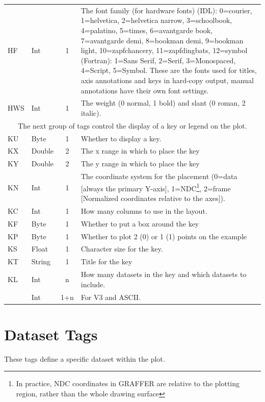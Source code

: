 \documentclass[english]{article}
\begin{document}
\begin{longtable}{|llcp{9cm}|}
  HF& Int& 1& The font family (for hardware fonts) (IDL): 0=courier,
  1=helvetica, 2=helvetica narrow, 3=schoolbook, 4=palatino, 5=times,
  6=avantgarde book, 7=avantgarde demi, 8=bookman demi, 9=bookman
  light, 10=zapfchancery, 11=zapfdingbats, 12=symbol (Fortran): 1=Sans
  Serif, 2=Serif, 3=Monospaced, 4=Script, 5=Symbol. These are the fonts
  used for titles, axis annotations and keys in hard-copy output,
  manual annotations have their own font
  settings.\\
  HWS& Int& 1&
  The weight (0 normal, 1 bold) and slant (0 roman, 2 italic).\\
  \hline \multicolumn{4}{|c|}{The next group of tags control the
    display of a key or legend on the
    plot.}\\
  \hline KU& Byte& 1&
  Whether to display a key.\\
  KX& Double& 2&
  The x range in which to place the key\\
  KY& Double& 2&
  The y range in which to place the key\\
  KN& Int& 1& The coordinate system for the placement (0=data [always
  the primary Y-axis], 1=NDC\footnote{In practice, NDC coordinates in
    GRAFFER are relative to the plotting region, rather than the whole
    drawing surface}, 2=frame [Normalized
  coordinates relative to the axes]).\\
  KC& Int& 1&
  How many columns to use in the layout.\\
  KF& Byte& 1&
  Whether to put a box around the key\\
  KP& Byte& 1&
  Whether to plot 2 (0) or 1 (1) points on the example\\
  KS & Float & 1 & Character size for the key.\\
  KT& String& 1&
  Title for the key\\
  KL& Int& n&
  How many datasets in the key and which datasets to include.\\
  & Int& 1+n&
  For V3 and ASCII.\\
\end{longtable}



\section{Dataset Tags}

These tags define a specific dataset within the plot.
\end{document}
